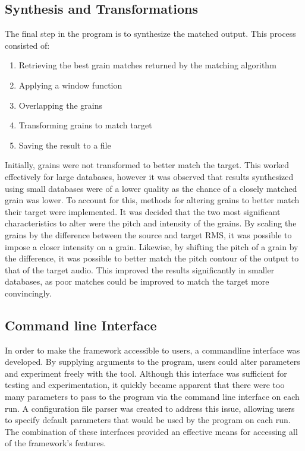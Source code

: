 \documentclass[titlepage]{scrartcl}
\begin{document}
    \subsection*{Synthesis and Transformations}
    The final step in the program is to synthesize the matched output.
    This process consisted of:
    \begin{enumerate}
        \item Retrieving the best grain matches returned by the matching algorithm
        \item Applying a window function
        \item Overlapping the grains 
        \item Transforming grains to match target
        \item Saving the result to a file
    \end{enumerate}
    Initially, grains were not transformed to better match the target.  This
    worked effectively for large databases, however it was observed that
    results synthesized using small databases were of a lower quality as the
    chance of a closely matched grain was lower. To account for this, methods
    for altering grains to better match their target were implemented.  It was
    decided that the two most significant characteristics to alter were the
    pitch and intensity of the grains.  By scaling the grains by the difference
    between the source and target RMS, it was possible to impose a closer
    intensity on a grain. Likewise, by shifting the pitch of a grain by the
    difference, it was possible to better match the pitch contour of the output
    to that of the target audio.  This improved the results significantly in
    smaller databases, as poor matches could be improved to match the target
    more convincingly.

    \subsection*{Command line Interface}
    In order to make the framework accessible to users, a commandline interface
    was developed. By supplying arguments to the program, users could alter
    parameters and experiment freely with the tool.  Although this interface
    was sufficient for testing and experimentation, it quickly became apparent
    that there were too many parameters to pass to the program via the command
    line interface on each run. A configuration file parser was created to
    address this issue, allowing users to specify default parameters that would
    be used by the program on each run. The combination of these interfaces
    provided an effective means for accessing all of the framework's features.
\end{document}

